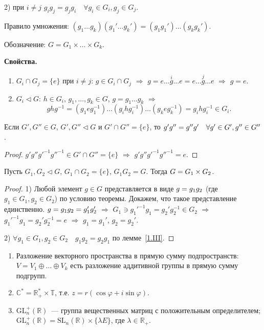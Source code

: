 \documentclass[a4paper]{article}
\newcommand{\svoy}{\vspace{5pt}\noindent\textbf{Свойства.}\vspace{-6pt}}
\newcommand*{\p}[1]{#1\nobreak\discretionary{}{\hbox{$\mathsurround=0pt #1$}}{}}
\begin{document}
2) при $i\neq j$ $g_i g_j=g_jg_i\quad \forall g_i\in G_i, g_j\in
G_j$.

Правило умножения: $(g_1\ldots g_k)(g_1'\ldots
g_k')=(g_1g_1')\ldots(g_kg_k')$.

Обозначение: $G=G_1\times\ldots\times G_k$.

\svoy
\begin{enumerate}
  \item $G_i\cap G_j=\{e\}$ при $i\neq j$: $g\in G_i\cap G_j$
  $\Rightarrow$ $g=e\ldots \stackrel{i}{g}\ldots e=e\ldots \stackrel{j}{g}\ldots
  e$ $\Rightarrow$ $g=e$.
  \item $G_i\triangleleft G$: $h\in G_i$, $g_1,\ldots,g_k\in G$, $g=g_1\ldots
  g_k$ $\Rightarrow$ $$ghg^{-1}=(g_1eg_1^{-1})\ldots(g_ihg_i^{-1})\ldots(g_keg_k^{-1})=g_ihg_i^{-1}\in
  G_i.$$
\end{enumerate}

\begin{lemm}
\label{1.III}Если $G', G''\in G$, $G',G''\triangleleft G$ и $G'\cap
G''=\{e\}$, то $g'g''\p=g''g'\quad \forall g'\in G', g''\in G''$.
\end{lemm}

\begin{proof}
$g'g''g'^{-1}g''^{-1}\in G'\cap G''=\{e\}$ $\Rightarrow$
$g'g''g'^{-1}g''^{-1}=e$.
\end{proof}

\begin{theorem}
Пусть $G_1,G_2\triangleleft G$, $G_1\cap G_2=\{e\}$, $G_1G_2=G$.
Тогда $G\p=G_1\times G_2$.
\end{theorem}

\begin{proof}
1) Любой элемент $g\in G$ представляется в виде $g\p=g_1g_2$ (где
$g_1\in G_1, g_2\in G_2$) по условию теоремы. Докажем, что такое
представление единственно. $g\p=g_1g_2=g_1'g_2'$ $\Rightarrow$
$G_1\ni g_1'^{-1}g_1=g_2'g_2^{-1}\in G_2$ $\Rightarrow$
$g_1'^{-1}g_1=g_2'g_2^{-1}=e$ $\Rightarrow$ $g_1=g_1'$, $g_2=g_2'$.

2) $\forall g_1\in G_1, g_2\in G_2\quad g_1g_2=g_2g_1$ по
лемме~\ref{1.III}.
\end{proof}

\prim
\begin{enumerate}
  \item Разложение векторного пространства в прямую сумму
  подпрост\-ранств: $V=V_1\oplus \ldots\oplus V_k$ есть разложение
  аддитивной группы в прямую сумму подгрупп.
  \item $\mathbb{C}^*=\mathbb{R}^*_+\times \mathbb{T}$, т.е.
  $z=r(\cos\varphi+i\sin\varphi)$.
  \item $\mathrm{GL}_n^+(\mathbb{R})$~--- группа вещественных матриц с
  положительным определителем; $\mathrm{GL}_n^+(\mathbb{R})=\mathrm{SL}_n(\mathbb{R})\times\{\lambda
  E\}$, где $\lambda\in \mathbb{R}_+$.
\end{enumerate}
\end{document}
